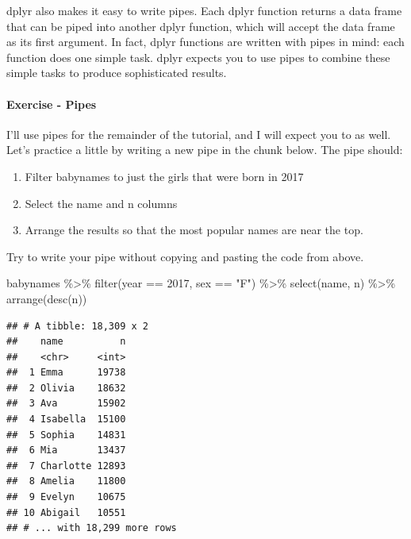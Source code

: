 \documentclass[
]{article}
\newenvironment{Shaded}{\begin{snugshade}}{\end{snugshade}}
\newcommand{\DecValTok}[1]{\textcolor[rgb]{0.00,0.00,0.81}{#1}}
\newcommand{\FunctionTok}[1]{\textcolor[rgb]{0.00,0.00,0.00}{#1}}
\newcommand{\NormalTok}[1]{#1}
\newcommand{\SpecialCharTok}[1]{\textcolor[rgb]{0.00,0.00,0.00}{#1}}
\newcommand{\StringTok}[1]{\textcolor[rgb]{0.31,0.60,0.02}{#1}}
\providecommand{\tightlist}{%
  \setlength{\itemsep}{0pt}\setlength{\parskip}{0pt}}
\begin{document}
dplyr also makes it easy to write pipes. Each dplyr function returns a
data frame that can be piped into another dplyr function, which will
accept the data frame as its first argument. In fact, dplyr functions
are written with pipes in mind: each function does one simple task.
dplyr expects you to use pipes to combine these simple tasks to produce
sophisticated results.

\hypertarget{exercise---pipes}{%
\paragraph{Exercise - Pipes}\label{exercise---pipes}}

I'll use pipes for the remainder of the tutorial, and I will expect you
to as well. Let's practice a little by writing a new pipe in the chunk
below. The pipe should:

\begin{enumerate}
\def\labelenumi{\arabic{enumi}.}
\tightlist
\item
  Filter babynames to just the girls that were born in 2017
\item
  Select the name and n columns
\item
  Arrange the results so that the most popular names are near the top.
\end{enumerate}

Try to write your pipe without copying and pasting the code from above.

\begin{Shaded}
\begin{Highlighting}[]
\NormalTok{babynames }\SpecialCharTok{\%\textgreater{}\%} 
  \FunctionTok{filter}\NormalTok{(year }\SpecialCharTok{==} \DecValTok{2017}\NormalTok{, sex }\SpecialCharTok{==} \StringTok{"F"}\NormalTok{) }\SpecialCharTok{\%\textgreater{}\%} 
  \FunctionTok{select}\NormalTok{(name, n) }\SpecialCharTok{\%\textgreater{}\%} 
  \FunctionTok{arrange}\NormalTok{(}\FunctionTok{desc}\NormalTok{(n))}
\end{Highlighting}
\end{Shaded}

\begin{verbatim}
## # A tibble: 18,309 x 2
##    name          n
##    <chr>     <int>
##  1 Emma      19738
##  2 Olivia    18632
##  3 Ava       15902
##  4 Isabella  15100
##  5 Sophia    14831
##  6 Mia       13437
##  7 Charlotte 12893
##  8 Amelia    11800
##  9 Evelyn    10675
## 10 Abigail   10551
## # ... with 18,299 more rows
\end{verbatim}
\end{document}
